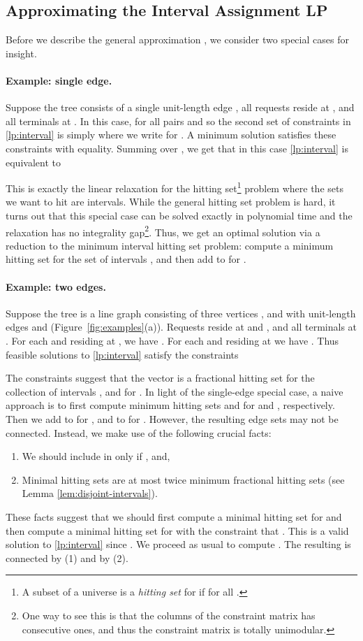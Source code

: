 \subsection{Approximating the Interval Assignment LP}
\label{sec:interval}
Before we describe the general approximation , we consider two special
cases for insight.

\paragraph{Example: single edge.}
Suppose the tree consists of a single unit-length edge ,
all requests reside at , and all terminals at . In this case,  for all pairs  and  so
the second set of constraints in \eqref{lp:interval} is simply
 where we
write  for . A minimum solution satisfies these
constraints with equality. Summing over , we get
that in this case \eqref{lp:interval} is equivalent to


This is exactly the linear relaxation for the hitting set\footnote{A
  subset  of a universe  is a \emph{hitting set} for
   if  for all .} problem where the sets we want to hit are
intervals. While the general hitting set problem is hard, it turns out
that this special case can be solved exactly in polynomial time and
the relaxation has no integrality gap\footnote{One way to see this is
  that the columns of the constraint matrix has consecutive ones, and
  thus the constraint matrix is totally unimodular.}. Thus, we get an
optimal solution via a reduction to the minimum interval hitting set
problem: compute a minimum hitting set  for the set of intervals
, and then add  to  for .

\paragraph{Example: two edges.}
Suppose the tree is a line graph consisting of three vertices ,
 and  with unit-length edges  and  (Figure~\ref{fig:examples}(a)). Requests reside at  and , and all terminals at
. For each  and  residing at , we have . For each  and  residing at  we have . Thus feasible solutions to
\eqref{lp:interval} satisfy the constraints

The constraints suggest that the vector  is a
fractional hitting set for the collection of intervals
, and  for
.
In light of the single-edge special case, a naive approach is to first
compute minimum hitting sets  and  for
 and , respectively. Then we add
 to  for , and  to  for . However, the resulting edge sets may not be connected.
Instead, we make use of the following crucial facts:
\begin{enumerate}
\item[(1)] We should include  in  only if , and,
\item[(2)] Minimal hitting sets are at most twice minimum fractional
  hitting sets (see Lemma \ref{lem:disjoint-intervals}).
\end{enumerate}
These facts suggest that we should first compute a minimal hitting set
 for  and then compute a minimal hitting set
 for  with the constraint that . This is a valid solution to \eqref{lp:interval}
since . We proceed as usual
to compute . The resulting  is connected by (1) and
 by (2).

